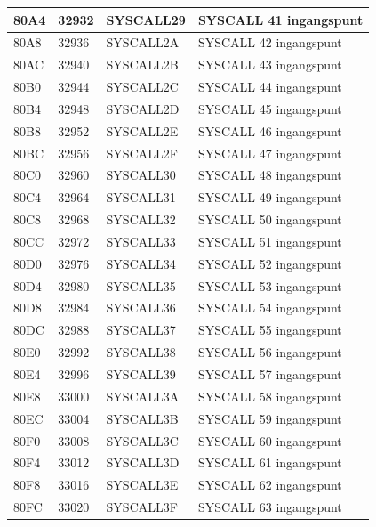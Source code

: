 \begin{longtable}{|L{1.2cm}|L{1.1cm}|C{2cm}|L{6cm}|}
\hline
\small  80A4 & \small 32932 & SYSCALL29 & SYSCALL 41 ingangspunt \\
\hline
\small  80A8 & \small 32936 & SYSCALL2A & SYSCALL 42 ingangspunt \\
\hline
\small  80AC & \small 32940 & SYSCALL2B & SYSCALL 43 ingangspunt \\
\hline
\small  80B0 & \small 32944 & SYSCALL2C & SYSCALL 44 ingangspunt \\
\hline
\small  80B4 & \small 32948 & SYSCALL2D & SYSCALL 45 ingangspunt \\
\hline
\small  80B8 & \small 32952 & SYSCALL2E & SYSCALL 46 ingangspunt \\
\hline
\small  80BC & \small 32956 & SYSCALL2F & SYSCALL 47 ingangspunt \\
\hline
\small  80C0 & \small 32960 & SYSCALL30 & SYSCALL 48 ingangspunt \\
\hline
\small  80C4 & \small 32964 & SYSCALL31 & SYSCALL 49 ingangspunt \\
\hline
\small  80C8 & \small 32968 & SYSCALL32 & SYSCALL 50 ingangspunt \\
\hline
\small  80CC & \small 32972 & SYSCALL33 & SYSCALL 51 ingangspunt \\
\hline
\small  80D0 & \small 32976 & SYSCALL34 & SYSCALL 52 ingangspunt \\
\hline
\small  80D4 & \small 32980 & SYSCALL35 & SYSCALL 53 ingangspunt \\
\hline
\small  80D8 & \small 32984 & SYSCALL36 & SYSCALL 54 ingangspunt \\
\hline
\small  80DC & \small 32988 & SYSCALL37 & SYSCALL 55 ingangspunt \\
\hline
\small  80E0 & \small 32992 & SYSCALL38 & SYSCALL 56 ingangspunt \\
\hline
\small  80E4 & \small 32996 & SYSCALL39 & SYSCALL 57 ingangspunt \\
\hline
\small  80E8 & \small 33000 & SYSCALL3A & SYSCALL 58 ingangspunt \\
\hline
\small  80EC & \small 33004 & SYSCALL3B & SYSCALL 59 ingangspunt \\
\hline
\small  80F0 & \small 33008 & SYSCALL3C & SYSCALL 60 ingangspunt \\
\hline
\small  80F4 & \small 33012 & SYSCALL3D & SYSCALL 61 ingangspunt \\
\hline
\small  80F8 & \small 33016 & SYSCALL3E & SYSCALL 62 ingangspunt \\
\hline
\small  80FC & \small 33020 & SYSCALL3F & SYSCALL 63 ingangspunt \\

\end{longtable}
